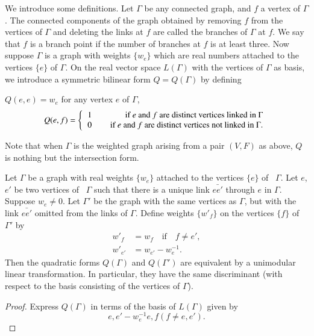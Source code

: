 We introduce some definitions. Let $\Gamma$ be any connected graph, and $f$ a vertex of $\Gamma$. The connected components of the graph obtained by removing $f$ from the vertices of $\Gamma$ and deleting the links at $f$ are called the branches of $\Gamma$ at $f$. We say that $f$ is a branch point if the number of branches at $f$ is at least three. Now suppose $\Gamma$ is a graph with weights $\{w_e\}$ which are real numbers attached to the vertices $\{e\}$ of $\Gamma$. On the real vector space $L (\Gamma)$ with the vertices of $\Gamma$ as basis, we introduce a symmetric bilinear form $Q = Q(\Gamma)$ by defining
\begin{center}
$Q (e, e) = w _e$  \hspace{2cm} for any vertex $e$ of $\Gamma$,
\begin{equation*}
Q (e,f) = 
\left\{
\begin{tabular}[c]{lr}
1 & \quad if $e$ and $f$ are distinct vertices linked in $\Gamma$\\
0 & \quad if $e$ and $f$ are distinct vertices not linked in $\Gamma$.
\end{tabular}
\right.
\end{equation*}
\end{center}
Note that when $\Gamma$ is the weighted graph arising from a pair $(V,F)$ as above, $Q$ is nothing but the intersection form.

\begin{lem}\label{art8-lem2}%
Let $\Gamma$ be a graph with real weights $\{w_e\}$ attached to the vertices $\{e\}$  of~ $\Gamma$. Let $e$, $e'$ be two vertices of~ $\Gamma$ such that there is a unique link $\bar{ee'}$ through $e$ in $\Gamma$. Suppose $w_e \neq 0$. Let $\Gamma'$ be the graph with the same vertices as $\Gamma$, but with the link $\bar{ee'}$ omitted from the links of $\Gamma$. Define weights $\{w'_f\}$ on the vertices $\{f\}$ of $\Gamma'$ by
\begin{align*}
w'_f &  = w_f \text{ ~~if~~ } f \neq e',\\
w'_{e'} & = w_{e'} - w^{-1}_{e}.
\end{align*}
Then the quadratic forms $Q (\Gamma)$ and $Q(\Gamma')$ are equivalent by a unimodular linear transformation. In particular, they have the same discriminant (with respect to the basis consisting of the vertices of $\Gamma$).
\end{lem}

\begin{proof}
Express $Q(\Gamma)$ in terms of the basis of $L(\Gamma)$ given by 
$$
e, e' - w^{-1}_e e, f (f \neq e, e').
$$
\vskip -1cm
\end{proof}

